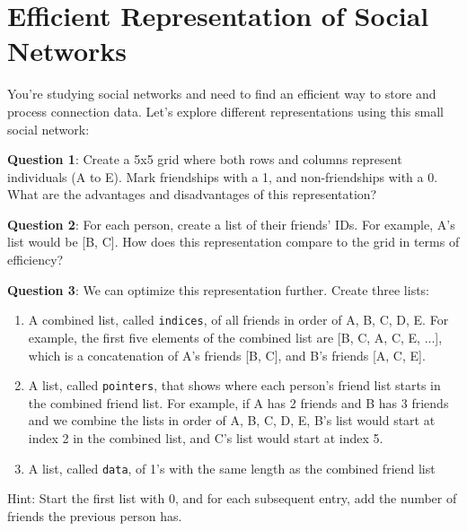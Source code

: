 \documentclass[a4paper, 14pt]{extarticle}
\begin{document}
\section*{Efficient Representation of Social Networks}

You're studying social networks and need to find an efficient way to store and process connection data. Let's explore different representations using this small social network:

\begin{center}
\end{center}

{\bf Question 1}:
Create a 5x5 grid where both rows and columns represent individuals (A to E). Mark friendships with a 1, and non-friendships with a 0. What are the advantages and disadvantages of this representation?

\vspace{10em}

{\bf Question 2}:
For each person, create a list of their friends' IDs. For example, A's list would be [B, C]. How does this representation compare to the grid in terms of efficiency?

\vspace{8em}

{\bf Question 3}:
We can optimize this representation further. Create three lists:
\begin{enumerate}
    \item A combined list, called \texttt{indices}, of all friends in order of A, B, C, D, E. For example, the first five elements of the combined list are [B, C, A, C, E, ...], which is a concatenation of A's friends [B, C], and B's friends [A, C, E].
    \item A list, called \texttt{pointers}, that shows where each person's friend list starts in the combined friend list. For example, if A has 2 friends and B has 3 friends and we combine the lists in order of A, B, C, D, E, B's list would start at index 2 in the combined list, and C's list would start at index 5.
    \item A list, called \texttt{data}, of 1's with the same length as the combined friend list
\end{enumerate}
Hint: Start the first list with 0, and for each subsequent entry, add the number of friends the previous person has.
\end{document}

